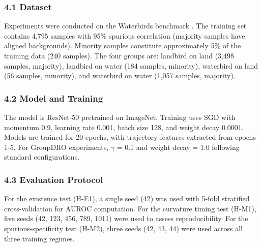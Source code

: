 
\subsubsection{4.1 Dataset}

Experiments were conducted on the Waterbirds benchmark \citep{Sagawa2020Distributionally}. The training set contains 4,795 samples with 95\% spurious correlation (majority samples have aligned backgrounds). Minority samples constitute approximately 5\% of the training data (240 samples). The four groups are: landbird on land (3,498 samples, majority), landbird on water (184 samples, minority), waterbird on land (56 samples, minority), and waterbird on water (1,057 samples, majority).

\subsubsection{4.2 Model and Training}

The model is ResNet-50 pretrained on ImageNet. Training uses SGD with momentum 0.9, learning rate 0.001, batch size 128, and weight decay 0.0001. Models are trained for 20 epochs, with trajectory features extracted from epochs 1-5. For GroupDRO experiments, $\gamma$ = 0.1 and weight decay = 1.0 following standard configurations.

\subsubsection{4.3 Evaluation Protocol}

For the existence test (H-E1), a single seed (42) was used with 5-fold stratified cross-validation for AUROC computation. For the curvature timing test (H-M1), five seeds (42, 123, 456, 789, 1011) were used to assess reproducibility. For the spurious-specificity test (H-M2), three seeds (42, 43, 44) were used across all three training regimes.
